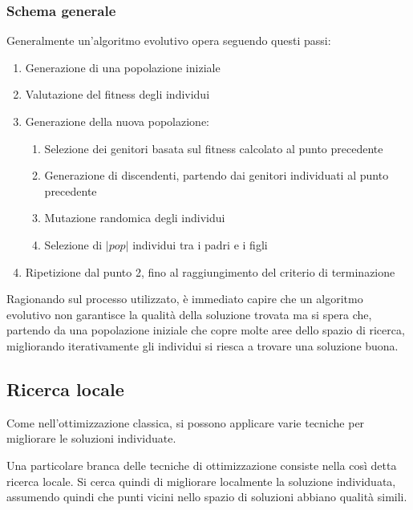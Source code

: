 \documentclass[a4paper]{article}
\begin{document}
\subsubsection{Schema generale}
Generalmente un'algoritmo evolutivo opera seguendo questi passi:
\begin{enumerate}
    \item Generazione di una popolazione iniziale
    \item Valutazione del fitness degli individui
    \item Generazione della nuova popolazione:
    \begin{enumerate}
        \item Selezione dei genitori basata sul fitness calcolato al punto precedente
        \item Generazione di discendenti, partendo dai genitori individuati al punto precedente
        \item Mutazione randomica degli individui
        \item Selezione di $|pop|$ individui tra i padri e i figli
    \end{enumerate}
    \item Ripetizione dal punto 2, fino al raggiungimento del criterio di terminazione
\end{enumerate}
Ragionando sul processo utilizzato, è immediato capire che un algoritmo evolutivo non garantisce
la qualità della soluzione trovata ma si spera che, partendo da una popolazione iniziale 
che copre molte aree dello spazio di ricerca, migliorando iterativamente gli individui 
si riesca a trovare una soluzione buona.

\subsection{Ricerca locale}
Come nell'ottimizzazione classica, si possono applicare varie tecniche per 
migliorare le soluzioni individuate.

Una particolare branca delle tecniche di ottimizzazione consiste nella così 
detta ricerca locale. Si cerca quindi di migliorare localmente la soluzione 
individuata, assumendo quindi che punti 
vicini nello spazio di soluzioni abbiano qualità simili.
\end{document}
